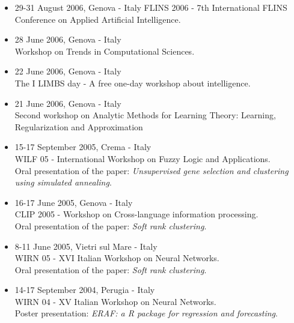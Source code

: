 \documentclass[a4paper,10pt]{article}
\begin{document}
\begin{itemize}
\item 29-31 August 2006, Genova - Italy
  FLINS 2006 - 7th International FLINS Conference on Applied Artificial Intelligence.
\item 28 June 2006, Genova - Italy \\
  Workshop on Trends in Computational Sciences.
\item 22 June 2006, Genova - Italy \\
  The I LIMBS day - A free one-day workshop about intelligence.
\item 21 June 2006, Genova - Italy \\
  Second workshop on Analytic Methods for Learning Theory: Learning, Regularization and Approximation
\item 15-17 September 2005, Crema - Italy \\
  WILF 05 - International Workshop on Fuzzy Logic and Applications.
  \\Oral presentation of the paper: \emph{Unsupervised gene selection and clustering using simulated annealing}.
\item 16-17 June 2005, Genova - Italy \\
  CLIP 2005 - Workshop on Cross-language information processing.
  \\Oral presentation of the paper: \emph{Soft rank clustering}.
\item 8-11 June 2005, Vietri sul Mare - Italy \\
  WIRN 05 - XVI Italian Workshop on Neural Networks.
  \\Oral presentation of the paper: \emph{Soft rank clustering}.
\item 14-17 September 2004, Perugia - Italy \\
  WIRN 04 - XV Italian Workshop on Neural Networks.
  \\Poster presentation: \emph{ERAF: a R package for regression and forecasting}.
\end{itemize}
\end{document}
